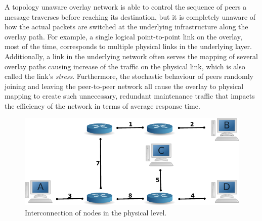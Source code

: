 \documentclass[acmcsur]{acmtrans2m}
\begin{document}
A topology unaware overlay network is able to control the sequence of peers a
message traverses before reaching its destination, but it is completely unaware
of how the actual packets are switched at the underlying infrastructure along
the overlay path. For example, a single logical point-to-point link on the
overlay, most of the time, corresponds to multiple physical links in the
underlying layer. Additionally, a link in the underlying network often serves
the mapping of several overlay paths causing increase of the traffic on the
physical link, which is also called the link's
\emph{stress}\cite{chu_esm_2002}.  Furthermore, the stochastic behaviour of
peers randomly joining and leaving the peer-to-peer network all cause the
overlay to physical mapping to create such unnecessary, redundant maintenance
traffic that impacts the efficiency of the network in terms of average response
time. 

%


\begin{figure}
\centering
  \includegraphics[scale=0.8]{img/phys.pdf}
\caption{Interconnection of nodes in the physical level.}
\label{figure:phys}
\end{figure}
\end{document}
